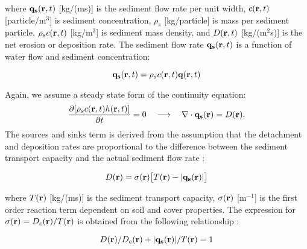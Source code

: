 \documentclass[fleqn,12pt,twoside]{article}
\begin{document}
\noindent
where
${\bf q_s}({\bf r},t)$ [kg/(ms)] is the sediment flow rate per unit width,
$c({\bf r},t)$ [particle/m$^3$] is sediment concentration,
$\rho_s$ [kg/particle] is mass per sediment particle,
$\rho_s c({\bf r},t)$ [kg/m$^3$] is sediment mass density,
and $D({\bf r},t)$ [kg/(m$^2$s)] is the net erosion or deposition rate.
The sediment flow rate ${\bf q_s}({\bf r},t) $ is a function of
water flow and sediment concentration:

\begin{equation}
\label{eq:sedflow}
  {\bf q_s}({\bf r},t) = \rho_sc({\bf r},t){\bf q}({\bf r},t)
\end{equation}

\noindent
Again, we assume a steady state form of
the continuity equation:
\begin{equation}
\label{eq:ssediment}
{\partial [\rho_sc({\bf r},t)h({\bf r},t)] \over \partial t}=0
\quad
\longrightarrow \quad
\nabla\cdot {\bf q_s}({\bf r}) = D({\bf r}) .
\end{equation}
\noindent
The sources and sinks term is derived from the assumption that
the detachment and deposition rates are proportional to the difference between
the sediment transport capacity and the actual sediment flow rate \cite{fostermeyer72}:

\begin{equation}
D({\bf r})
=\sigma({\bf r}) \bigl[ T({\bf r})- |{\bf q_s}({\bf r})|\bigr]
\end{equation}

\noindent
where $T({\bf r})$ [kg/(ms)] is the sediment transport capacity,
$\sigma({\bf r})$ [m$^{-1}$] is the first order reaction term
 dependent on soil and cover properties.
 The expression for $\sigma({\bf r})=D_c({\bf r})/T({\bf r})$
is obtained from the following relationship \cite{fostermeyer72}:

\begin{equation}
D({\bf r})/D_c({\bf r}) + |{\bf q_s}({\bf r})|/T({\bf r}) = 1
\end{equation}
\end{document}
